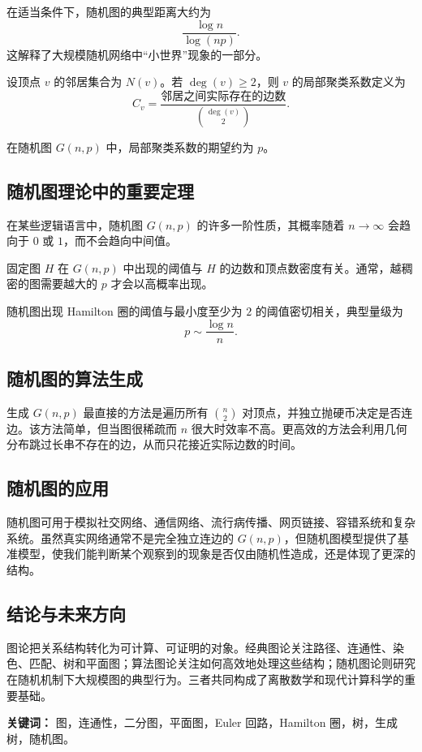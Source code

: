 \begin{theorem}[$G(n,p)$ 的直径]
在适当条件下，随机图的典型距离大约为
\[
    \frac{\log n}{\log(np)}.
\]
这解释了大规模随机网络中“小世界”现象的一部分。
\end{theorem}

\begin{definition}[局部聚类系数]
设顶点 $v$ 的邻居集合为 $N(v)$。若 $\deg(v)\ge2$，则 $v$ 的局部聚类系数定义为
\[
    C_v=\frac{\text{邻居之间实际存在的边数}}{\binom{\deg(v)}{2}}.
\]
\end{definition}

\begin{theorem}[$G(n,p)$ 的聚类系数]
在随机图 $G(n,p)$ 中，局部聚类系数的期望约为 $p$。
\end{theorem}

\subsection{随机图理论中的重要定理}

\begin{theorem}[零一律]
在某些逻辑语言中，随机图 $G(n,p)$ 的许多一阶性质，其概率随着 $n\to\infty$ 会趋向于 $0$ 或 $1$，而不会趋向中间值。
\end{theorem}

\begin{theorem}[子图阈值]
固定图 $H$ 在 $G(n,p)$ 中出现的阈值与 $H$ 的边数和顶点数密度有关。通常，越稠密的图需要越大的 $p$ 才会以高概率出现。
\end{theorem}

\begin{theorem}[Hamilton 圈]
随机图出现 Hamilton 圈的阈值与最小度至少为 $2$ 的阈值密切相关，典型量级为
\[
    p\sim \frac{\log n}{n}.
\]
\end{theorem}

\subsection{随机图的算法生成}

生成 $G(n,p)$ 最直接的方法是遍历所有 $\binom n2$ 对顶点，并独立抛硬币决定是否连边。该方法简单，但当图很稀疏而 $n$ 很大时效率不高。更高效的方法会利用几何分布跳过长串不存在的边，从而只花接近实际边数的时间。

\subsection{随机图的应用}

随机图可用于模拟社交网络、通信网络、流行病传播、网页链接、容错系统和复杂系统。虽然真实网络通常不是完全独立连边的 $G(n,p)$，但随机图模型提供了基准模型，使我们能判断某个观察到的现象是否仅由随机性造成，还是体现了更深的结构。

\subsection{结论与未来方向}

图论把关系结构转化为可计算、可证明的对象。经典图论关注路径、连通性、染色、匹配、树和平面图；算法图论关注如何高效地处理这些结构；随机图论则研究在随机机制下大规模图的典型行为。三者共同构成了离散数学和现代计算科学的重要基础。

\textbf{关键词：} 图，连通性，二分图，平面图，Euler 回路，Hamilton 圈，树，生成树，随机图。
